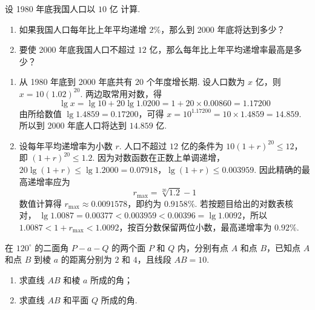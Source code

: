 \documentclass[UTF8,a4paper,oneside,11pt]{ctexbook}
\begin{document}
\begin{problem}
设 1980 年底我国人口以 \(10\text{ 亿}\) 计算.

\begin{enumerate}
\item 如果我国人口每年比上年平均递增 \(2\%\)，那么到 2000 年底将达到多少？
\item 要使 2000 年底我国人口不超过 \(12\text{ 亿}\)，那么每年比上年平均递增率最高是多少？
\end{enumerate}

\begin{center}
\end{center}
\end{problem}

\begin{solution}
\begin{enumerate}
\item 从 1980 年底到 2000 年底共有 \(20\) 个年度增长期. 设人口数为 \(x\) 亿，则
\(x=10(1.02)^{20}\). 两边取常用对数，得
\[
\lg x=\lg10+20\lg1.0200=1+20\times0.00860=1.17200
\]
由所给数值 \(\lg1.4859=0.17200\)，可得 \(x=10^{1.17200}=10\times1.4859=14.859\). 所以到 2000 年底人口将达到 \(14.859\text{ 亿}\).
\item 设每年平均递增率为小数 \(r\). 人口不超过 \(12\) 亿的条件为
\(10(1+r)^{20}\leqslant12\)，即 \((1+r)^{20}\leqslant1.2\). 因为对数函数在正数上单调递增，
\(20\lg(1+r)\leqslant\lg1.2000=0.07918\)，\(\lg(1+r)\leqslant0.003959\).
因此精确的最高递增率应为
\[
r_{\max}=\sqrt[20]{1.2}-1
\]
数值计算得 \(r_{\max}\approx0.0091578\)，即约为 \(0.9158\%\). 若按题目给出的对数表核对，
\(\lg1.0087=0.00377<0.003959<0.00396=\lg1.0092\)，所以
\(1.0087<1+r_{\max}<1.0092\)，按百分数保留两位小数，最高递增率为 \(0.92\%\).
\end{enumerate}
\end{solution}

\begin{problem}
在 \(120^{\circ}\) 的二面角 \(P - a - Q\) 的两个面 \(P\) 和 \(Q\) 内，分别有点 \(A\) 和点 \(B\)，已知点 \(A\) 和点 \(B\) 到棱 \(a\) 的距离分别为 \(2\) 和 \(4\)，且线段 \(AB = 10\).

\begin{enumerate}
\item 求直线 \(AB\) 和棱 \(a\) 所成的角；
\item 求直线 \(AB\) 和平面 \(Q\) 所成的角.
\end{enumerate}
\end{problem}
\end{document}
